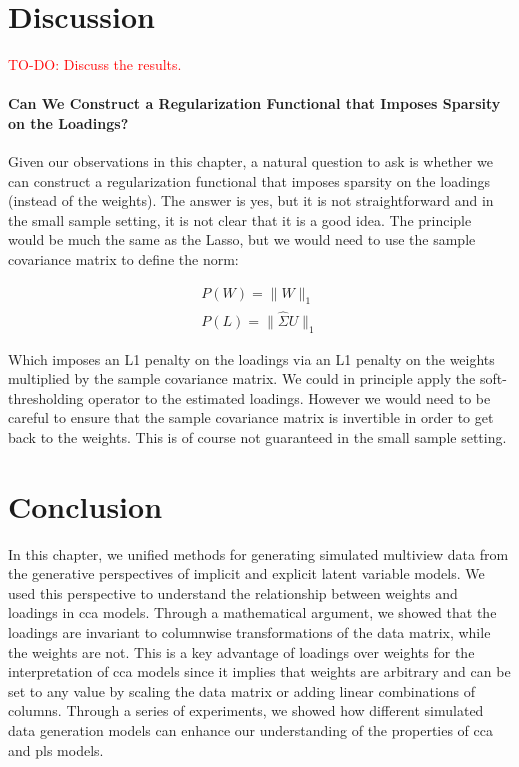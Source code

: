 \section{Discussion}

\textcolor{red}{TO-DO: Discuss the results.}

\paragraph{Can We Construct a Regularization Functional that Imposes Sparsity on the Loadings?}
Given our observations in this chapter, a natural question to ask is whether we can construct a regularization functional that imposes sparsity on the \gls{loadings} (instead of the weights).
The answer is yes, but it is not straightforward and in the small sample setting, it is not clear that it is a good idea.
The principle would be much the same as the Lasso, but we would need to use the sample covariance matrix to define the norm:

\begin{align}
    P(W)=\|W\|_1 \\
    P(L)=\|\hat{\Sigma}U\|_1
\end{align}

Which imposes an L1 penalty on the \gls{loadings} via an L1 penalty on the \gls{weights} multiplied by the sample covariance matrix.
We could in principle apply the soft-thresholding operator to the estimated loadings.
However we would need to be careful to ensure that the sample covariance matrix is invertible in order to get back to the weights.
This is of course not guaranteed in the small sample setting.

\section{Conclusion}

In this chapter, we unified methods for generating simulated multiview data from the generative perspectives of implicit and explicit latent variable models.
We used this perspective to understand the relationship between weights and loadings in \acrshort{cca} models.
Through a mathematical argument, we showed that the \gls{loadings} are invariant to columnwise transformations of the data matrix, while the weights are not.
This is a key advantage of \gls{loadings} over weights for the interpretation of \acrshort{cca} models since it implies that weights are arbitrary and can be set to any value by scaling the data matrix or adding linear combinations of columns.
Through a series of experiments, we showed how different simulated data generation models can enhance our understanding of the properties of \acrshort{cca} and \acrshort{pls} models.